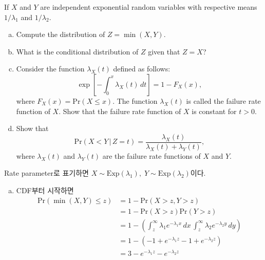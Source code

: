 \documentclass[answers]{exam}
\begin{document}
\newpage
{}
\begin{questions}
   \question
   If $X$ and $Y$ are independent exponential random variables with respective means $1/\lambda_{1}$ and $1/\lambda_{2}$.
   \begin{enumerate}[(a)]
    \item Compute the distribution of $Z=\min\left(X,Y\right)$.
    \item What is the conditional distribution of $Z$ given that $Z=X$?
    \item Consider the function $\lambda_{X}\left(t\right)$ defined as follows:
    \begin{equation}
        \exp\left[-\int_{0}^{x}\lambda_{X}\left(t\right)\,dt \right]=1-F_{X}\left(x\right),
    \end{equation}
    where $F_{X}\left(x\right)=\mathrm{Pr}\left(X\leq x\right)$. The function $\lambda_{X}\left(t\right)$ is called the failure rate function of $X$. Show that the failure rate function of $X$ is constant for $t>0$.
    \item Show that
    \begin{equation}
        \mathrm{Pr}\left(X<Y\,|\,Z=t\right)=\dfrac{\lambda_{X}\left(t\right)}{\lambda_{X}\left(t\right)+\lambda_{Y}\left(t\right)},
    \end{equation}
    where $\lambda_{X}\left(t\right)$ and $\lambda_{Y}\left(t\right)$ are the failure rate functions of $X$ and $Y$.
   \end{enumerate}
   \begin{solution}
    Rate parameter로 표기하면 $X\sim \mathrm{Exp}\left(\lambda_{1}\right),\; Y\sim\mathrm{Exp}\left(\lambda_{2}\right)$이다.
    \begin{enumerate}[(a)]
      \item CDF부터 시작하면
      \begin{align}
        \mathrm{Pr}\left(\min\left(X,Y\right)\leq z\right) &= 1-\mathrm{Pr}\left(X>z,Y>z\right)\\
        &=1-\mathrm{Pr}\left(X>z\right)\mathrm{Pr}\left(Y>z\right)\\
        &=1-\left(\int_{z}^{\infty}\lambda_{1}e^{-\lambda_{1}x}\,dx\,\int_{z}^{\infty}\lambda_{2}e^{-\lambda_{2}y}\,dy\right)\\
        &=1-\left(-1+e^{-\lambda_{1}z}-1+e^{-\lambda_{2}z}\right)\\
        &= 3-e^{-\lambda_{1}z}-e^{-\lambda_{2}z}
      \end{align}
    \end{enumerate}


\end{solution}
\end{questions}
\end{document}
